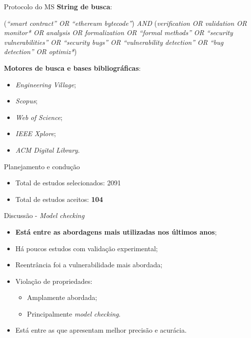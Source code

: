 \begin{frame}{Protocolo do MS}
\textbf{String de busca}:
    \begin{center}
    (\textit{``smart contract'' OR ``ethereum bytecode''}) \textit{AND} (\textit{verification OR validation OR monitor* OR analysis OR formalization OR ``formal methods'' OR ``security vulnerabilities'' OR ``security bugs'' OR ``vulnerability detection'' OR ``bug detection'' OR optimiz*})
    \end{center}
\textbf{Motores de busca e bases bibliográficas}:
    \begin{itemize}
        \item \textit{Engineering Village};
        \item \textit{Scopus};
        \item \textit{Web of Science};
        \item \textit{IEEE Xplore};
        \item \textit{ACM Digital Library}.
    \end{itemize}
\end{frame}

\begin{frame}{Planejamento e condução}
    \begin{itemize}
        \item Total de estudos selecionados: 2091
        \item Total de estudos aceitos: \textbf{104}
    \end{itemize}
\end{frame}

\begin{frame}{Discussão - \textit{Model checking}}
    \begin{itemize}
        \item \textbf{Está entre as abordagens mais utilizadas nos últimos anos};
        \item Há poucos estudos com validação experimental;
        \item Reentrância foi a vulnerabilidade mais abordada;
        \item Violação de propriedades:
        \begin{itemize}
        	\item Amplamente abordada;
        	\item Principalmente \textit{model checking}.
        \end{itemize}
    	\item Está entre as que apresentam melhor precisão e acurácia.
    \end{itemize}
\end{frame}

